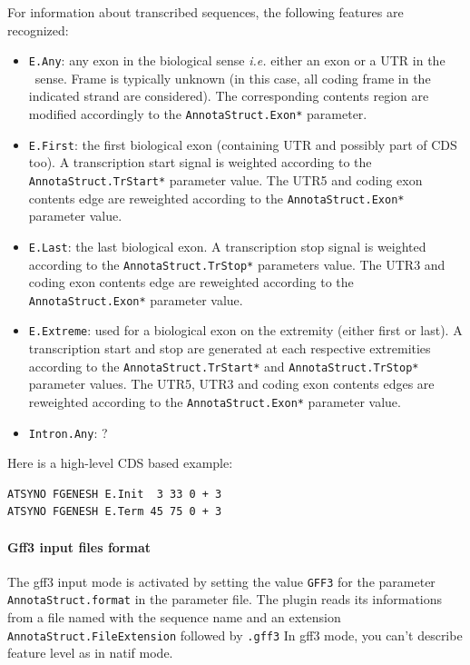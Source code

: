 For information about transcribed sequences, the following features
are recognized:
\begin{itemize}
\item \texttt{E.Any}: any exon in the biological sense \textit{i.e.}
  either an exon or a UTR in the \EuGene\ sense. Frame is typically
  unknown (in this case, all coding frame in the indicated strand are
  considered). The corresponding contents region are modified
  accordingly to the \texttt{AnnotaStruct.Exon*} parameter.
\item \texttt{E.First}: the first biological exon (containing UTR and
  possibly part of CDS too). A transcription start signal is weighted
  according to the \texttt{AnnotaStruct.TrStart*} parameter value. The
  UTR5 and coding exon contents edge are reweighted according to the
  \texttt{AnnotaStruct.Exon*} parameter value.
\item \texttt{E.Last}: the last biological exon. A transcription stop
  signal is weighted according to the \texttt{Annota\-Struct.TrStop*}
  parameters value. The UTR3 and coding exon contents edge are
  reweighted according to the \texttt{AnnotaStruct.Exon*} parameter
  value.
\item \texttt{E.Extreme}: used for a biological exon on the extremity
  (either first or last).  A transcription start and stop are
  generated at each respective extremities according to the
  \texttt{AnnotaStruct.TrStart*} and \texttt{AnnotaStruct.TrStop*}
  parameter values. The UTR5, UTR3 and coding exon contents edges are
  reweighted according to the \texttt{AnnotaStruct.Exon*} parameter
  value.
\item \texttt{Intron.Any}: ?
\end{itemize}


Here is a high-level CDS based example:
\begin{Verbatim}[fontsize=\small]
ATSYNO FGENESH E.Init  3 33 0 + 3
ATSYNO FGENESH E.Term 45 75 0 + 3
\end{Verbatim}

\paragraph{Gff3 input files format}

The gff3 input mode is activated by setting the value \texttt{GFF3}
for the parameter \texttt{AnnotaStruct.format} in the parameter file.
The plugin reads its informations from a file named with the sequence
name and an extension \texttt{AnnotaStruct.FileExtension} followed by
\texttt{.gff3} In gff3 mode, you can't describe feature level as in
natif mode.

